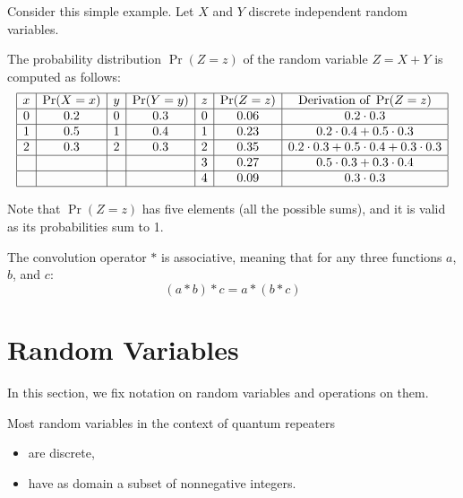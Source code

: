 \documentclass{masterthesis}
\begin{document}
Consider this simple example. Let $X$ and $Y$ discrete independent random variables. 

The probability distribution $\Pr(Z = z)$ of the random variable $Z = X + Y$ is computed as follows:
\begin{equation}
    \begin{array}{|c|c|c|c|c|c|c|}
        \hline
        x & \Pr(X = x) & y & \Pr(Y = y) & z & \Pr(Z = z) & \text{Derivation of }\Pr(Z = z)\\
        \hline
        0 & 0.2 & 0 & 0.3 & 0 & 0.06 & 0.2 \cdot 0.3 \\
        \hline
        1 & 0.5 & 1 & 0.4 & 1 & 0.23 & 0.2 \cdot 0.4 + 0.5 \cdot 0.3 \\
        \hline
        2 & 0.3 & 2 & 0.3 & 2 & 0.35 & 0.2 \cdot 0.3 + 0.5 \cdot 0.4 + 0.3 \cdot 0.3 \\
        \hline
         &  &  &  & 3 & 0.27 & 0.5 \cdot 0.3 + 0.3 \cdot 0.4 \\
        \hline
         &  &  &  & 4 & 0.09 & 0.3 \cdot 0.3 \\
        \hline
    \end{array}
\end{equation}

Note that $\Pr(Z = z)$ has five elements (all the possible sums), and it is valid as its probabilities sum to 1.

\begin{samepage}\label{page:convolution_associativity}
    The convolution operator \( * \) is associative, meaning that for any three functions \(a\), \(b\), and \(c\):
    \begin{equation}
        (a * b) * c = a * (b * c)
    \end{equation}        
\end{samepage}

\section*{Random Variables}

In this section, we fix notation on random variables and operations on them. 

Most random variables in the context of quantum repeaters
\begin{itemize}
    \item are discrete,
    \item have as domain a subset of nonnegative integers.
\end{itemize}
\end{document}
